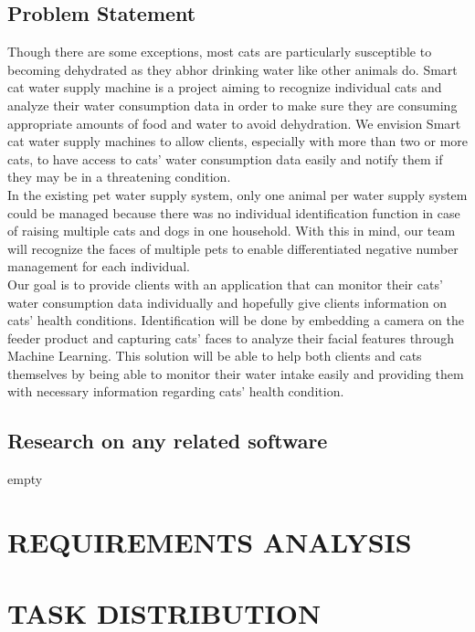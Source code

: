 \documentclass[conference]{IEEEtran}
\begin{document}
\subsection{Problem Statement}
Though there are some exceptions, most cats are particularly susceptible to becoming dehydrated as they abhor drinking water like other animals do. Smart cat water supply machine is a project aiming to recognize individual cats and analyze their water consumption data in order to make sure they are consuming appropriate amounts of food and water to avoid dehydration. We envision Smart cat water supply machines to allow clients, especially with more than two or more cats, to have access to cats' water consumption data easily and notify them if they may be in a threatening condition. \\

In the existing pet water supply system, only one animal per water supply system could be managed because there was no individual identification function in case of raising multiple cats and dogs in one household. With this in mind, our team will recognize the faces of multiple pets to enable differentiated negative number management for each individual. \\

Our goal is to provide clients with an application that can monitor their cats’ water consumption data individually and hopefully give clients information on cats’ health conditions. Identification will be done by embedding a camera on the feeder product and capturing cats’ faces to analyze their facial features through Machine Learning. This solution will be able to help both clients and cats themselves by being able to monitor their water intake easily and providing them with necessary information regarding cats' health condition. \\

\subsection{Research on any related software}
empty \\

\section{REQUIREMENTS ANALYSIS}
\section{TASK DISTRIBUTION}
\end{document}
